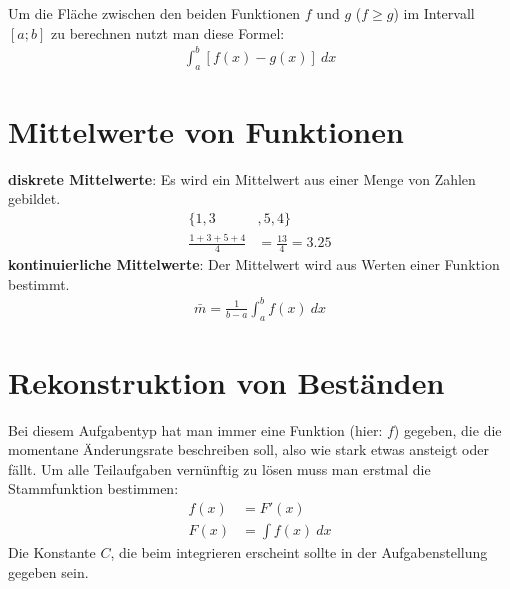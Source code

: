 \begin{flushleft}
    Um die Fläche zwischen den beiden Funktionen $f$ und $g$ ($f \geq g$) im Intervall $[a;b]$ zu berechnen nutzt man diese Formel:
    \begin{align}
        \int_{a}^{b} [f(x)-g(x)] \ dx
    \end{align}
\end{flushleft}

\section{Mittelwerte von Funktionen}

\begin{flushleft}
    \textbf{diskrete Mittelwerte}: \newline
    Es wird ein Mittelwert aus einer Menge von Zahlen gebildet. \newline
    \begin{align}
        \{1,3&,5,4\} \\
        \frac{1+3+5+4}{4}&=\frac{13}{4}=3.25
    \end{align}
    \newline
    \textbf{kontinuierliche Mittelwerte}: \newline
    Der Mittelwert wird aus Werten einer Funktion bestimmt. \newline
    \begin{align}
        \bar{m}=\frac{1}{b-a}\int_{a}^{b} f(x) \ dx
    \end{align}
\end{flushleft}

\section{Rekonstruktion von Beständen}

\begin{flushleft}
    Bei diesem Aufgabentyp hat man immer eine Funktion (hier: $f$) gegeben, die die momentane Änderungsrate beschreiben soll, also wie stark etwas ansteigt oder fällt.
    Um alle Teilaufgaben vernünftig zu lösen muss man erstmal die Stammfunktion bestimmen:
    \begin{align}
        f(x)&=F'(x) \\
        F(x)&=\int f(x) \ dx
    \end{align}
    Die Konstante $C$, die beim integrieren erscheint sollte in der Aufgabenstellung gegeben sein.
\end{flushleft}

